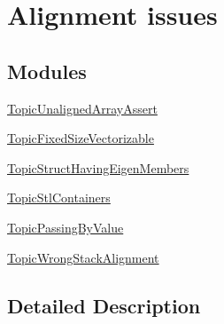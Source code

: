 \hypertarget{group___dense_matrix_manipulation___alignement}{}\section{Alignment issues}
\label{group___dense_matrix_manipulation___alignement}
\subsection*{Modules}
\begin{DoxyCompactItemize}
\item 
\hyperlink{group___topic_unaligned_array_assert}{Topic\+Unaligned\+Array\+Assert}
\item 
\hyperlink{group___topic_fixed_size_vectorizable}{Topic\+Fixed\+Size\+Vectorizable}
\item 
\hyperlink{group___topic_struct_having_eigen_members}{Topic\+Struct\+Having\+Eigen\+Members}
\item 
\hyperlink{group___topic_stl_containers}{Topic\+Stl\+Containers}
\item 
\hyperlink{group___topic_passing_by_value}{Topic\+Passing\+By\+Value}
\item 
\hyperlink{group___topic_wrong_stack_alignment}{Topic\+Wrong\+Stack\+Alignment}
\end{DoxyCompactItemize}


\subsection{Detailed Description}
